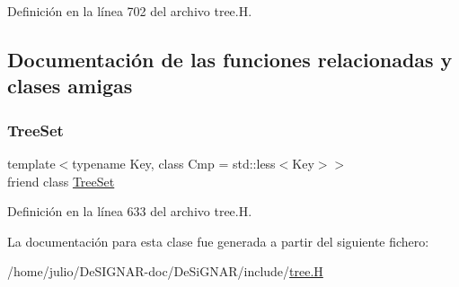 Definición en la línea 702 del archivo tree.\+H.



\subsection{Documentación de las funciones relacionadas y clases amigas}
\mbox{\label{class_designar_1_1_tree_set_1_1_inorder_iterator_a7caa42294700d2a60905ec3458a7cd8a}} 
\subsubsection{\texorpdfstring{Tree\+Set}{TreeSet}}
{\footnotesize\ttfamily template$<$typename Key, class Cmp = std\+::less$<$\+Key$>$$>$ \\
friend class \hyperlink{class_designar_1_1_tree_set}{Tree\+Set}\hspace{0.3cm}{\ttfamily [friend]}}



Definición en la línea 633 del archivo tree.\+H.



La documentación para esta clase fue generada a partir del siguiente fichero\+:\begin{DoxyCompactItemize}
\item 
/home/julio/\+De\+S\+I\+G\+N\+A\+R-\/doc/\+De\+Si\+G\+N\+A\+R/include/\hyperlink{tree_8_h}{tree.\+H}\end{DoxyCompactItemize}
